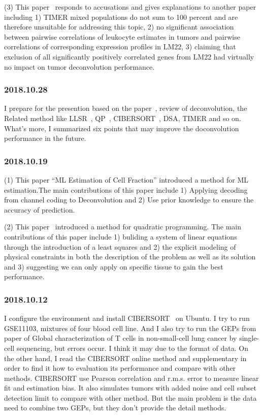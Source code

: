 \documentclass{article}
\begin{document}
(3) This paper~\cite{Newman2017Data} responds to accusations and gives explanations to another paper~\cite{Li2017Revisit} including 1) TIMER mixed populations do not sum to 100 percent and are therefore unsuitable for addressing this topic, 2) no significant association between pairwise correlations of leukocyte estimates in tumors and pairwise correlations of corresponding expression profiles in LM22, 3) claiming that exclusion of all significantly positively correlated genes from LM22 had virtually no impact on tumor deconvolution performance.   

\subsubsection{2018.10.28}
I prepare for the presention based on the paper~\cite{Mohammadi2017A}, review of deconvolution, the Related method like LLSR~\cite{Abbas2009Deconvolution}, QP~\cite{Gong2011Optimal}, CIBERSORT~\cite{Newman2015Robust}, DSA, TIMER and so on. What's more, I summarized six points that may improve the doconvolution performance in the future.

\subsubsection{2018.10.19}
(1) This paper ``ML Estimation of Cell Fraction'' introduced a method for ML estimation.The main contributions of this paper include 1) Applying decoding from channel coding to Deconvolution and 2) Use prior knowledge to ensure the accuracy of prediction.

(2) This paper~\cite{Gong2011Optimal} introduced a method for quadratic programming. The main contributions of this paper include 1) buliding a system of linear equations through the introduction of a least squares and 2) the explicit modeling of physical constraints in both the description of the problem as well as its solution and 3) suggesting we can only apply on specific tissue to gain the best performance.

\subsubsection{2018.10.12}
I configure the environment and install CIBERSORT~\cite{Newman2015Robust} on Ubuntu. I try to run GSE11103, mixtures of four blood cell line. And I also try to run the GEPs from paper of Global characterization of T cells in non-small-cell lung cancer by single-cell sequencing, but errors occur. I think it may due to the format of data. On the other hand, I read the CIBERSORT online method and supplementary in order to find it how to evaluation its performance and compare with other methods. CIBERSORT use Pearson correlation and r.m.s. error to measure linear fit and estimation bias. It also simulates tumors with added noise and cell subset detection limit to compare with other method. But the main problem is the data need to combine two GEPs, but they don't provide the detail methods.
\end{document}
